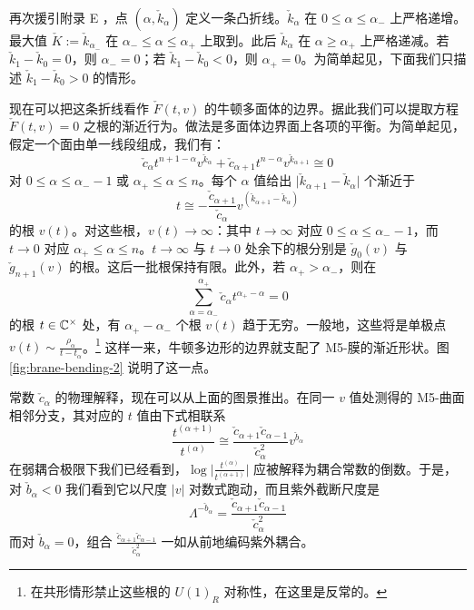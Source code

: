 再次援引附录 E%
，点 $(\alpha, \check k_\alpha)$ 定义一条凸折线。$\check k_\alpha$ 在 $0 \leq \alpha \leq \alpha_-$ 上严格递增。最大值 $\check K := \check k_{\alpha_-}$ 在 $\alpha_- \leq \alpha \leq \alpha_+$ 上取到。此后 $\check k_\alpha$ 在 $\alpha \geq \alpha_+$ 上严格递减。若 $\check k_1 - \check k_0 =0$，则 $\alpha_-=0$；若 $\check k_1 - \check k_0 < 0$，则 $\alpha_+=0$。为简单起见，下面我们只描述 $\check k_1 - \check k_0 > 0$ 的情形。


现在可以把这条折线看作 $\check F(t,v)$ 的牛顿多面体的边界。据此我们可以提取方程 $\check F(t,v)=0$ 之根的渐近行为。做法是多面体边界面上各项的平衡。为简单起见，假定一个面由单一线段组成，我们有：
\begin{equation}\label{eq:ch05-balance}
\check c_\alpha t^{n+1-\alpha} v^{\check k_\alpha} + \check c_{\alpha +1} t^{n-\alpha} v^{\check k_{\alpha +1} }
\cong 0
\end{equation}
对 $0 \leq \alpha \leq \alpha_--1$ 或 $\alpha_+\leq \alpha \leq n$。每个 $\alpha$ 值给出 $\vert \check k_{\alpha+1} - \check k_{\alpha} \vert$ 个渐近于
\begin{equation}\label{eq:ch05-tasym}
t \cong - \frac{\check c_{\alpha +1}}{\check c_\alpha} v^{(\check k_{\alpha+1} - \check k_{\alpha}
)}
\end{equation}
的根 $v(t)$。对这些根，$v(t)\to \infty$：其中 $t\to \infty$ 对应 $0\leq \alpha \leq \alpha_--1$，而 $t\to 0$ 对应 $\alpha_+\leq \alpha \leq n$。$t\to \infty$ 与 $t\to 0$ 处余下的根分别是 $\check g_0(v)$ 与 $\check g_{n+1}(v)$ 的根。这后一批根保持有限。此外，若 $\alpha_+>\alpha_-$，则在
\begin{equation}\label{eq:intermed}
\sum_{\alpha=\alpha_-}^{\alpha_+} \check c_{\alpha} t^{\alpha_+-\alpha} =0
\end{equation}
的根 $t\in \mathbb{C}^\times$ 处，有 $\alpha_+-\alpha_-$ 个根 $v(t)$ 趋于无穷。一般地，这些将是单极点 $v(t) \sim \frac{\rho_\alpha}{t-t_\alpha}$。\footnote{在共形情形禁止这些根的 $U(1)_R$ 对称性，在这里是反常的。} 这样一来，牛顿多边形的边界就支配了 M5-膜的渐近形状。图 \ref{fig:brane-bending-2} 说明了这一点。

常数 $\check c_\alpha$ 的物理解释，现在可以从上面的图景推出。在同一 $v$ 值处测得的 M5-曲面相邻分支，其对应的 $t$ 值由下式相联系
\begin{equation}\label{eq:ch05-trunning}
\frac{t^{(\alpha+1)}}{t^{(\alpha)}} \cong \frac{ \check c_{\alpha+1} \check c_{\alpha
-1}}{\check c_\alpha^2} v^{\check b_\alpha}
\end{equation}
在弱耦合极限下我们已经看到，$\log\vert\frac{t^{(\alpha)}}{t^{(\alpha +1)}}\vert$ 应被解释为耦合常数的倒数。于是，对 $\check b_\alpha<0$ 我们看到它以尺度 $\vert v \vert$ 对数式跑动，而且紫外截断尺度是
\begin{equation}\label{eq:ch05-Lambda}
\Lambda^{-\check b_\alpha} =\frac{ \check c_{\alpha+1} \check c_{\alpha -1}}{\check c_\alpha^2}
\end{equation}
而对 $\check b_\alpha=0$，组合 $\frac{ \check c_{\alpha+1} \check c_{\alpha
-1}}{\check c_\alpha^2}$ 一如从前地编码紫外耦合。

